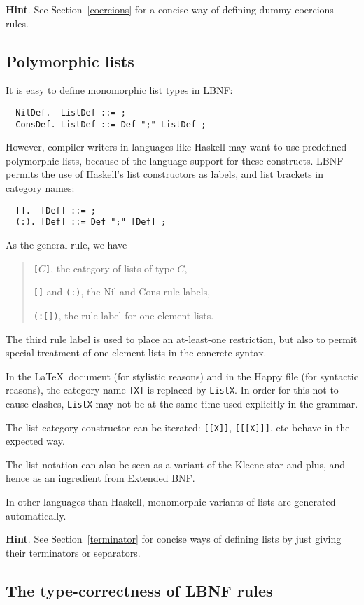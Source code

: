 \documentclass[10pt]{article}
\newcommand{\bequ}{\begin{quote}}
\newcommand{\enqu}{\end{quote}}
\begin{document}
{\bf Hint}. See Section~\ref{coercions} for a concise way of defining
dummy coercions rules.



\subsection{Polymorphic lists}

It is easy to define monomorphic list types in LBNF:
\begin{verbatim}
  NilDef.  ListDef ::= ;
  ConsDef. ListDef ::= Def ";" ListDef ;
\end{verbatim}
However, compiler writers in languages like
Haskell may want to use predefined 
polymorphic lists, because of the language support for these constructs. 
LBNF permits the use of Haskell's list constructors
as labels, and list brackets in category names:
\begin{verbatim}
  [].  [Def] ::= ;
  (:). [Def] ::= Def ";" [Def] ;
\end{verbatim}
As the general rule, we have
\bequ
{\tt[}$C${\tt ]}, the category of lists of type $C$,
 
{\tt []} and {\tt (:)}, the Nil and Cons rule labels,

{\tt (:[])}, the rule label for one-element lists. 
\enqu
The third rule label is used to place an at-least-one restriction,
but also to permit special treatment of one-element lists
in the concrete syntax. 

In the \LaTeX\ document (for stylistic reasons) and in the Happy file (for 
syntactic reasons), the category name {\tt [X]} is replaced by {\tt ListX}. 
In order for this not to cause clashes, {\tt ListX} 
may not be at the same time used explicitly in the grammar.

The list category constructor can be iterated: {\tt [[X]]}, {\tt [[[X]]]}, etc
behave in the expected way.

The list notation can also be seen as a variant of the Kleene star and plus, and 
hence as an ingredient from Extended BNF.

In other languages than Haskell, monomorphic variants of lists are generated
automatically.

{\bf Hint}. See Section~\ref{terminator} for concise ways of defining
lists by just giving their terminators or separators.


\subsection{The type-correctness of LBNF rules}
\end{document}
